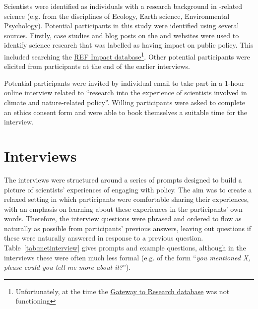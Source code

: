 Scientists were identified as individuals with a research background in \CAN-related science (e.g. from the disciplines of Ecology, Earth science, Environmental Psychology). Potential participants in this study were identified using several sources. Firstly, case studies and blog posts on the \REF{} and \UKRI{} websites were used to identify \CAN{} science research that was labelled as having impact on public policy. This included searching the \href{https://results2021.ref.ac.uk/impact}{REF Impact database}\footnote{Unfortunately, at the time the \UKRI{} \href{https://gtr.gtr.ukri.org/}{Gateway to Research database} was not functioning}. Other potential participants were elicited from participants at the end of the earlier interviews.

Potential participants were invited by individual email to take part in a 1-hour online interview related to ``research into the experience of scientists involved in climate and nature-related policy''. Willing participants were asked to complete an ethics consent form and were able to book themselves a suitable time for the interview.

\section{Interviews}\label{sec:metinterview}

The interviews were structured around a series of prompts designed to build a picture of scientists' experiences of engaging with policy. The aim was to create a relaxed setting in which participants were comfortable sharing their experiences, with an emphasis on learning about these experiences in the participants' own words. Therefore, the interview questions were phrased and ordered to flow as naturally as possible from participants' previous answers, leaving out questions if these were naturally answered in response to a previous question. Table~\ref{tab:metinterview} gives prompts and example questions, although in the interviews these were often much less formal (e.g. of the form ``\textit{you mentioned X, please could you tell me more about it?}'').

